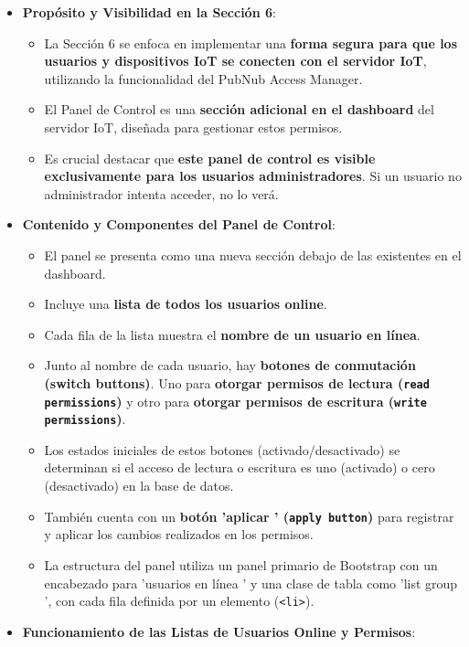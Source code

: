 \documentclass{report}
\begin{document}
\begin{itemize}
    \item \textbf{Propósito y Visibilidad en la Sección 6}:
    \begin{itemize}
        \item La Sección 6 se enfoca en implementar una \textbf{forma segura para que los usuarios y dispositivos IoT se conecten con el servidor IoT}, 
        utilizando la funcionalidad del PubNub Access Manager.
        \item El Panel de Control es una \textbf{sección adicional en el dashboard} del servidor IoT, diseñada para gestionar estos permisos.
        \item Es crucial destacar que \textbf{este panel de control es visible exclusivamente para los usuarios administradores}. Si un usuario no 
        administrador intenta acceder, no lo verá.
    \end{itemize}
    \item \textbf{Contenido y Componentes del Panel de Control}:
    \begin{itemize}
        \item El panel se presenta como una nueva sección debajo de las existentes en el dashboard.
        \item Incluye una \textbf{lista de todos los usuarios online}.
        \item Cada fila de la lista muestra el \textbf{nombre de un usuario en línea}.
        \item Junto al nombre de cada usuario, hay \textbf{botones de conmutación (switch buttons)}. Uno para \textbf{otorgar permisos de lectura 
        (\texttt{read permissions})} y otro para \textbf{otorgar permisos de escritura (\texttt{write permissions})}.
        \item Los estados iniciales de estos botones (activado/desactivado) se determinan si el acceso de lectura o escritura es uno (activado) o cero 
        (desactivado) en la base de datos.
        \item También cuenta con un \textbf{botón  'aplicar ' (\texttt{apply button})} para registrar y aplicar los cambios realizados en los permisos.
        \item La estructura del panel utiliza un panel primario de Bootstrap con un encabezado para  'usuarios en línea ' y una clase de tabla como  
        'list group ', con cada fila definida por un elemento (\texttt{<li>}).
    \end{itemize}
    \item \textbf{Funcionamiento de las Listas de Usuarios Online y Permisos}:

\end{itemize}
\end{document}
